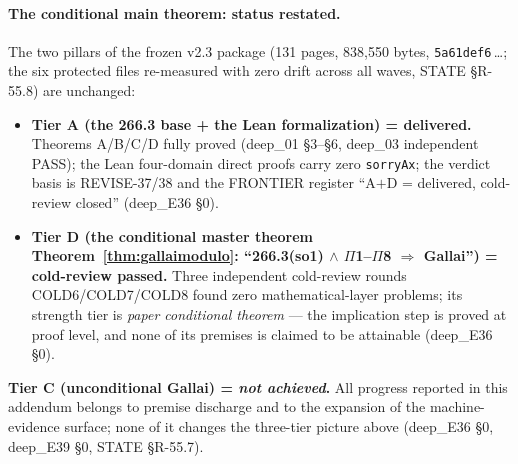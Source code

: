 \paragraph{The conditional main theorem: status restated.} The two pillars of
the frozen v2.3 package (131 pages, 838{,}550 bytes, \texttt{5a61def6}\,\dots;
the six protected files re-measured with zero drift across all waves, STATE
\S R-55.8) are unchanged:
\begin{itemize}
\item \textbf{Tier A (the 266.3 base + the Lean formalization) = delivered.}
Theorems A/B/C/D fully proved (deep\_01 \S3--\S6, deep\_03 independent
PASS); the Lean four-domain direct proofs carry zero \texttt{sorryAx};
the verdict basis is REVISE-37/38 and the FRONTIER register ``A$+$D =
delivered, cold-review closed'' (deep\_E36 \S0).
\item \textbf{Tier D (the conditional master theorem Theorem~\ref{thm:gallaimodulo}:
``266.3(so1) $\wedge$ $\Pi$1--$\Pi$8 $\Rightarrow$ Gallai'') = cold-review
passed.} Three independent cold-review rounds COLD6/COLD7/COLD8 found zero
mathematical-layer problems; its strength tier is \emph{paper conditional
theorem} --- the implication step is proved at proof level, and none of its
premises is claimed to be attainable (deep\_E36 \S0).
\end{itemize}
\textbf{Tier C (unconditional Gallai) = \emph{not achieved}.} All progress
reported in this addendum belongs to premise discharge and to the expansion of
the machine-evidence surface; none of it changes the three-tier picture above
(deep\_E36 \S0, deep\_E39 \S0, STATE \S R-55.7).

